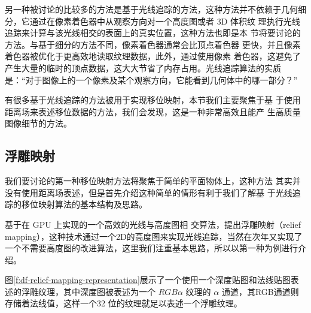 另一种被讨论的比较多的方法是基于光线追踪的方法，这种方法并不依赖于几何细分，它通过在像素着色器中从观察方向对一个高度图或者 3D 体积纹 理执行光线追踪来计算与该光线相交的表面上的真实位置，这种方法也即是本 节将要讨论的方法。与基于细分的方法不同，像素着色器通常会比顶点着色器 更快，并且像素着色器被优化于更高效地读取纹理数据，此外，通过使用像素 着色器，这避免了产生大量的临时的顶点数据，这大大节省了内存占用。光线追踪算法的实质是：“对于图像上的一个像素及某个观察方向，它能看到几何体中的哪一部分？”

有很多基于光线追踪的方法被用于实现移位映射，本节我们主要聚焦于基 于使用距离场来表述移位数据的方法，我们会发现，这是一种非常高效且能产 生高质量图像细节的方法。



\subsection{浮雕映射}
我们要讨论的第一种移位映射方法将聚焦于简单的平面物体上，这种方法 其实并没有使用距离场表述，但是首先介绍这种简单的情形有利于我们了解基 于光线追踪的移位映射算法的基本结构及思路。

\cite{a:Real-TimeReliefMappingonArbitraryPolygonalSurfaces}基于在 GPU 上实现的一个高效的光线与高度图相 交算法，提出浮雕映射（relief mapping），这种技术通过一个2D的高度图来实现光线追踪，当然在次年\cite{a:ReliefMappingofNo-Height-FieldSurfaceDetails}又实现了一个不需要高度图的改进算法，这里我们注重基本思路，所以以第一种为例进行介绍。

图\ref{f:df-relief-mapping-representation}展示了一个使用一个深度贴图和法线贴图表述的浮雕纹理，其中深度图被表述为一个 $RGB\alpha$ 纹理的 $\alpha$ 通道，其RGB通道则存储着法线值，这样一个32 位的纹理就足以表述一个浮雕纹理。

